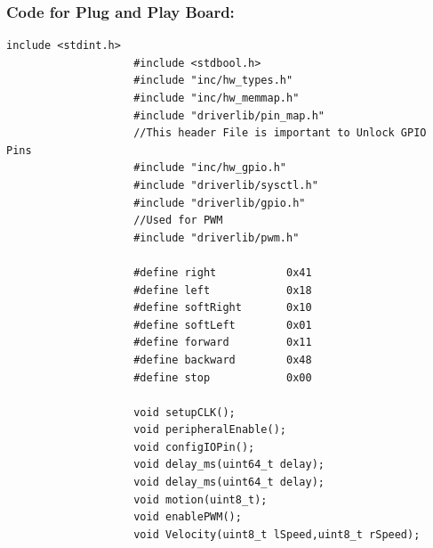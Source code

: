 \documentclass[a4paper,12pt,oneside]{article}
\begin{document}
				\subsubsection{\textbf{Code for Plug and Play Board:}}
				\begin{lstlisting}[style=CStyle]
					include <stdint.h>
					#include <stdbool.h>
					#include "inc/hw_types.h"
					#include "inc/hw_memmap.h"
					#include "driverlib/pin_map.h"
					//This header File is important to Unlock GPIO Pins
					#include "inc/hw_gpio.h"
					#include "driverlib/sysctl.h"
					#include "driverlib/gpio.h"
					//Used for PWM
					#include "driverlib/pwm.h"
					
					#define right           0x41
					#define left            0x18
					#define softRight       0x10
					#define softLeft        0x01
					#define forward         0x11
					#define backward        0x48
					#define stop            0x00
					
					void setupCLK();
					void peripheralEnable();
					void configIOPin();
					void delay_ms(uint64_t delay);
					void delay_ms(uint64_t delay);
					void motion(uint8_t);
					void enablePWM();
					void Velocity(uint8_t lSpeed,uint8_t rSpeed);
					

\end{lstlisting}
\end{document}
